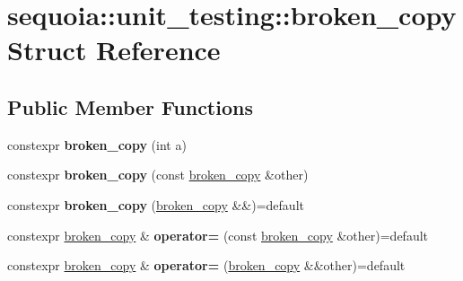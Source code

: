 \hypertarget{structsequoia_1_1unit__testing_1_1broken__copy}{}\section{sequoia\+::unit\+\_\+testing\+::broken\+\_\+copy Struct Reference}
\label{structsequoia_1_1unit__testing_1_1broken__copy}
\subsection*{Public Member Functions}
\begin{DoxyCompactItemize}
\item 
\mbox{\label{structsequoia_1_1unit__testing_1_1broken__copy_a478cda7c8e5c47e3fad6fd4d2cbf0531}} 
constexpr {\bfseries broken\+\_\+copy} (int a)
\item 
\mbox{\label{structsequoia_1_1unit__testing_1_1broken__copy_ad2531217f99fb9521f309895f21aa97f}} 
constexpr {\bfseries broken\+\_\+copy} (const \mbox{\hyperlink{structsequoia_1_1unit__testing_1_1broken__copy}{broken\+\_\+copy}} \&other)
\item 
\mbox{\label{structsequoia_1_1unit__testing_1_1broken__copy_a95032bc612c92a734add437da5f2aa0b}} 
constexpr {\bfseries broken\+\_\+copy} (\mbox{\hyperlink{structsequoia_1_1unit__testing_1_1broken__copy}{broken\+\_\+copy}} \&\&)=default
\item 
\mbox{\label{structsequoia_1_1unit__testing_1_1broken__copy_ac4f5e05c5540c8b0b16ba30b62259086}} 
constexpr \mbox{\hyperlink{structsequoia_1_1unit__testing_1_1broken__copy}{broken\+\_\+copy}} \& {\bfseries operator=} (const \mbox{\hyperlink{structsequoia_1_1unit__testing_1_1broken__copy}{broken\+\_\+copy}} \&other)=default
\item 
\mbox{\label{structsequoia_1_1unit__testing_1_1broken__copy_a3391127b77d78654d0644ff46e3492b8}} 
constexpr \mbox{\hyperlink{structsequoia_1_1unit__testing_1_1broken__copy}{broken\+\_\+copy}} \& {\bfseries operator=} (\mbox{\hyperlink{structsequoia_1_1unit__testing_1_1broken__copy}{broken\+\_\+copy}} \&\&other)=default
\end{DoxyCompactItemize}

